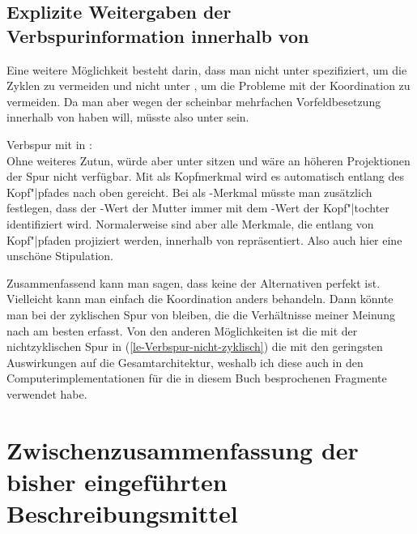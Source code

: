 \subsection{Explizite Weitergaben der Verbspurinformation innerhalb von \texorpdfstring{\local}{LOCAL}}

Eine weitere Möglichkeit besteht darin, dass man \dsl nicht unter \head spezifiziert, um die Zyklen
zu vermeiden und nicht unter \cat, um die Probleme mit der Koordination zu vermeiden. Da man aber
wegen der scheinbar mehrfachen Vorfeldbesetzung \dsl innerhalb von \local haben will, müsste \dsl
also unter \local sein.

\eas
\label{le-verbspur-DSL-unter-LOCAL}%
Verbspur mit \dsl in \local:\\
\zs
Ohne weiteres Zutun, würde \dsl aber unter \local sitzen und wäre an höheren Projektionen der Spur
nicht verfügbar. Mit \dsl als Kopfmerkmal wird es automatisch entlang des Kopf"|pfades nach oben
gereicht. Bei \dsl als \local-Merkmal müsste man zusätzlich festlegen, dass der \dsl-Wert der Mutter
immer mit dem \dsl-Wert der Kopf"|tochter identifiziert wird. Normalerweise sind aber alle Merkmale,
die entlang von Kopf"|pfaden projiziert werden, innerhalb von \head repräsentiert. Also auch hier
eine unschöne Stipulation.

Zusammenfassend kann man sagen, dass keine der Alternativen perfekt ist. Vielleicht kann man einfach
die Koordination anders behandeln. Dann könnte man bei der zyklischen Spur von
\citet[207]{Meurers2000b} bleiben, die die Verhältnisse meiner Meinung nach am besten erfasst. Von den
anderen Möglichkeiten ist die mit der nichtzyklischen Spur in (\ref{le-Verbspur-nicht-zyklisch}) die mit den geringsten
Auswirkungen auf die Gesamtarchitektur, weshalb ich diese auch in den Computerimplementationen für
die in diesem Buch besprochenen Fragmente verwendet habe.

\section{Zwischenzusammenfassung der bisher eingeführten Beschreibungsmittel}
\label{Abschnitt-Beschriebungsmittel-HPSG}

